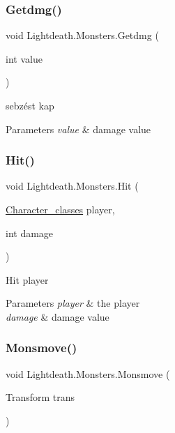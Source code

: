 \subsubsection{\texorpdfstring{Getdmg()}{Getdmg()}}
{\footnotesize\ttfamily void Lightdeath.\+Monsters.\+Getdmg (\begin{DoxyParamCaption}\item[{int}]{value }\end{DoxyParamCaption})\hspace{0.3cm}{\ttfamily [inline]}}



sebzést kap 


\begin{DoxyParams}{Parameters}
{\em value} & damage value\\
\hline
\end{DoxyParams}
\hypertarget{class_lightdeath_1_1_monsters_a942b447b0399d3a84db2d94018a89cd7}{}\label{class_lightdeath_1_1_monsters_a942b447b0399d3a84db2d94018a89cd7} 
\subsubsection{\texorpdfstring{Hit()}{Hit()}}
{\footnotesize\ttfamily void Lightdeath.\+Monsters.\+Hit (\begin{DoxyParamCaption}\item[{\hyperlink{class_lightdeath_1_1_character__classes}{Character\+\_\+classes}}]{player,  }\item[{int}]{damage }\end{DoxyParamCaption})\hspace{0.3cm}{\ttfamily [inline]}}



Hit player 


\begin{DoxyParams}{Parameters}
{\em player} & the player\\
\hline
{\em damage} & damage value\\
\hline
\end{DoxyParams}
\hypertarget{class_lightdeath_1_1_monsters_a158db6739c1bdfc33fabc6ba7424981a}{}\label{class_lightdeath_1_1_monsters_a158db6739c1bdfc33fabc6ba7424981a} 
\subsubsection{\texorpdfstring{Monsmove()}{Monsmove()}}
{\footnotesize\ttfamily void Lightdeath.\+Monsters.\+Monsmove (\begin{DoxyParamCaption}\item[{Transform}]{trans }\end{DoxyParamCaption})\hspace{0.3cm}{\ttfamily [inline]}}



